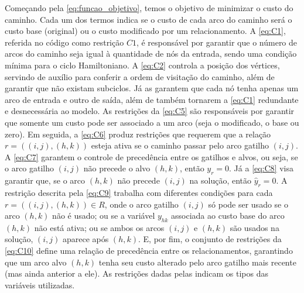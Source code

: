 Começando pela \cref{eq:funcao_objetivo}, temos o objetivo de minimizar o custo do caminho. Cada um dos termos indica se o custo de cada arco do caminho será o custo base (original) ou o custo modificado por um relacionamento. A \cref{eq:C1}, referida no código como restrição $C1$, é responsável por garantir que o número de arcos do caminho seja igual à quantidade de nós da entrada, sendo uma condição mínima para o ciclo Hamiltoniano. A \cref{eq:C2} controla a posição dos vértices, servindo de auxílio para conferir a ordem de visitação do caminho, além de garantir que não existam subciclos. Já as  garantem que cada nó tenha apenas um arco de entrada e outro de saída, além de também tornarem a \cref{eq:C1} redundante e desnecessária ao modelo. As restrições da \cref{eq:C5} são responsáveis por garantir que somente um custo pode ser associado a um arco (seja o modificado, o base ou zero). Em seguida, a \cref{eq:C6} produz restrições que requerem que a relação $r=((i,j), (h,k))$ esteja ativa se o caminho passar pelo arco gatilho $(i,j)$. A \cref{eq:C7} garantem o controle de precedência entre os gatilhos e alvos, ou seja, se o arco gatilho $(i,j)$ não precede o alvo $(h,k)$, então $y_r = 0$. Já a \cref{eq:C8} visa garantir que, se o arco $(h,k)$ não precede $(i,j)$ na solução, então $\hat{y}_r = 0$. A restrição descrita pela \cref{eq:C9} trabalha com diferentes condições para cada $r=((i,j), (h,k)) \in R$, onde o arco gatilho $(i,j)$ só pode ser usado se o arco $(h,k)$ não é usado; ou se a variável $y_{hk}$ associada ao custo base do arco $(h,k)$ não está ativa; ou se ambos os arcos $(i,j)$ e $(h,k)$ são usados na solução, $(i,j)$ aparece após $(h,k)$. E, por fim, o conjunto de restrições da \cref{eq:C10} define uma relação de precedência entre os relacionamentos, garantindo que um arco alvo $(h,k)$ tenha seu custo alterado pelo arco gatilho mais recente (mas ainda anterior a ele). As restrições dadas pelas  indicam os tipos das variáveis utilizadas.
